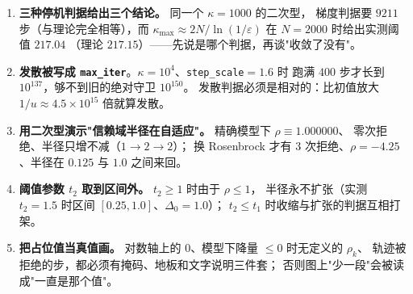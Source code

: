 \begin{enumerate}
  \item \textbf{三种停机判据给出三个结论。} 同一个 $\kappa=1000$ 的二次型，
        梯度判据要 $9211$ 步（与理论完全相等），而
        $\kappa_{\max}\approx2N/\ln(1/\varepsilon)$ 在 $N=2000$ 时给出实测阈值 $217.04$
        （理论 $217.15$）——先说是哪个判据，再谈"收敛了没有"。
  \item \textbf{发散被写成 \texttt{max\_iter}}。$\kappa=10^4$、\texttt{step\_scale}$=1.6$ 时
        跑满 $400$ 步才长到 $10^{137}$，够不到旧的绝对守卫 $10^{150}$。
        发散判据必须是相对的：比初值放大 $1/u\approx4.5\times10^{15}$ 倍就算发散。
  \item \textbf{用二次型演示"信赖域半径在自适应"。} 精确模型下 $\rho\equiv1.000000$、
        零次拒绝、半径只增不减（$1\to2\to2$）；
        换 Rosenbrock 才有 $3$ 次拒绝、$\rho=-4.25$、半径在 $0.125$ 与 $1.0$ 之间来回。
  \item \textbf{阈值参数 $t_2$ 取到区间外。} $t_2\ge1$ 时由于 $\rho\le1$，
        半径永不扩张（实测 $t_2=1.5$ 时区间 $[0.25,1.0]$、$\Delta_0=1.0$）；
        $t_2\le t_1$ 时收缩与扩张的判据互相打架。
  \item \textbf{把占位值当真值画。} 对数轴上的 $0$、模型下降量 $\le0$ 时无定义的 $\rho_k$、
        轨迹被拒绝的步，都必须有掩码、地板和文字说明三件套；
        否则图上"少一段"会被读成"一直是那个值"。
\end{enumerate}
